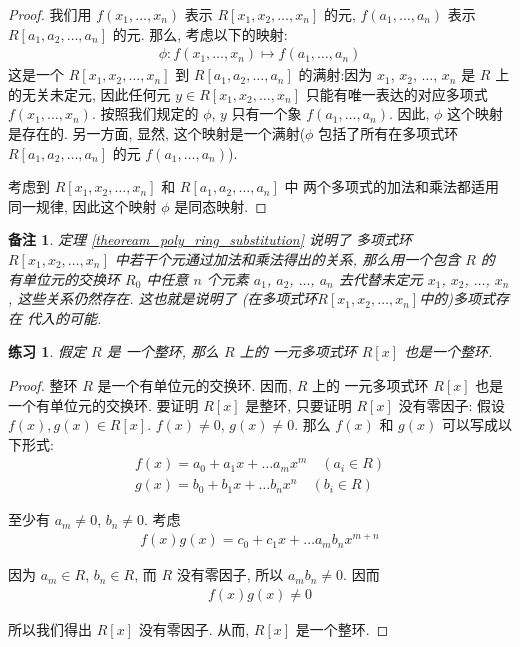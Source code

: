 \documentclass[utf8]{ctexbook}
\newtheorem{memo}{备注}[section]
\newtheorem{exercise}{练习}[section]
\begin{document}
\begin{proof}
我们用 $f(x_1, \ldots , x_n)$ 表示 $R[x_1, x_2, \ldots, x_{n} ]$ 的元, $f(a_1, \ldots , a_n)$ 表示 $R[a_1, a_2, \ldots, a_{n} ]$ 的元. 那么, 考虑以下的映射:
\begin{align*}
\phi: f(x_1, \ldots , x_n) \mapsto f(a_1, \ldots , a_n)
\end{align*}
这是一个 $R[x_1, x_2, \ldots, x_{n} ]$ 到 $R[a_1, a_2, \ldots, a_{n} ]$ 的满射:因为 $x_1$, $x_2$, $\ldots$, $x_n$ 是 $R$ 上的无关未定元, 因此任何元 $y \in R[x_1, x_2, \ldots, x_{n} ] $ 只能有唯一表达的对应多项式 $f(x_1, \ldots, x_n)$. 按照我们规定的 $\phi$, $y$ 只有一个象 $f(a_1, \ldots, a_n)$. 因此, $\phi$ 这个映射是存在的. 另一方面, 显然, 这个映射是一个满射($\phi$ 包括了所有在多项式环 $R[a_1, a_2, \ldots, a_{n} ]$ 的元 $f(a_1, \ldots, a_n)$).

考虑到 $R[x_1, x_2, \ldots, x_{n} ]$ 和 $R[a_1, a_2, \ldots, a_{n} ]$ 中 两个多项式的加法和乘法都适用同一规律, 因此这个映射 $\phi$ 是同态映射.

\end{proof}

\begin{memo}
定理 \ref{theoream_poly_ring_substitution} 说明了 多项式环 $R[x_1, x_2, \ldots, x_{n} ]$ 中若干个元通过加法和乘法得出的关系, 那么用一个包含 $R$ 的 有单位元的交换环 $R_0$ 中任意 $n$ 个元素 $a_1$, $a_2$, $\ldots$, $a_n$ 去代替未定元 $x_1$, $x_2$, $\ldots$, $x_n$ , 这些关系仍然存在. 这也就是说明了 (在多项式环$R[x_1, x_2, \ldots, x_{n} ]$中的)多项式存在 代入的可能. 
\end{memo}

\begin{exercise}
假定 $R$ 是 一个整环, 那么 $R$ 上的 一元多项式环 $R[x]$ 也是一个整环.
\end{exercise}

\begin{proof}
整环 $R$ 是一个有单位元的交换环. 因而, $R$ 上的 一元多项式环 $R[x]$ 也是一个有单位元的交换环. 要证明 $R[x]$ 是整环, 只要证明 $R[x]$ 没有零因子:
假设 $f(x) , g(x) \in R[x]$. $f(x) \neq 0$, $g(x) \neq 0$. 那么 $f(x)$ 和 $g(x)$ 可以写成以下形式:
\begin{align*}
f(x) = a_0 + a_1 x + \ldots a_m x^m \quad (a_i \in R) \\
g(x) = b_0 + b_1 x + \ldots b_n x^n \quad (b_i \in R)
\end{align*}

至少有 $a_m \neq 0$, $b_n \neq 0$.  考虑
\begin{align*}
f(x) g(x) = c_0 + c_1 x + \ldots a_m b_n x^{m+n} 
\end{align*}

因为 $a_m \in R$, $b_n \in R$, 而 $R$ 没有零因子, 所以 $a_m b_n \neq 0 $. 因而 
\begin{align*}
f(x) g(x) \neq 0
\end{align*} 

所以我们得出 $R[x]$ 没有零因子. 从而,  $R[x]$ 是一个整环.

\end{proof}
\end{document}
